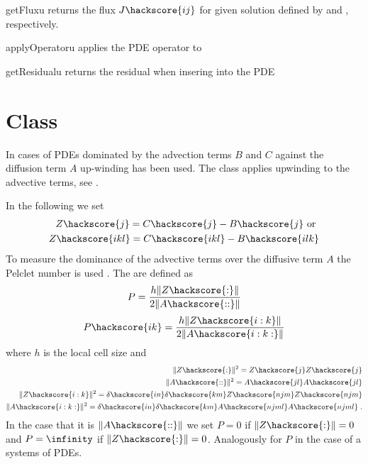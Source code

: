\begin{methoddesc}[LinearPDE]{getFlux}{u}
returns the flux $J\hackscore{ij}$  for given solution 
defined by  and , respectively.
\end{methoddesc}

\begin{methoddesc}[LinearPDE]{applyOperator}{u}
applies the PDE operator to 
\end{methoddesc}

\begin{methoddesc}[LinearPDE]{getResidual}{u}
returns the residual when insering  into the PDE
\end{methoddesc}

\section{\AdvectivePDE Class}
In cases of PDEs dominated by the advection terms $B$ and $C$ against the diffusion term $A$
up-winding has been used. 
The \AdvectivePDE class applies upwinding to the advective terms, see . 

In the following we set
\begin{eqnarray}\label{LINEARPDE.UPWIND.Z}
Z\hackscore{j}=C\hackscore{j}-B\hackscore{j}
\mbox{ or } \\
Z\hackscore{ikl}=C\hackscore{ikl}-B\hackscore{ilk}
\end{eqnarray}
To measure the dominance of the advective terms over the diffusive term $A$ the 
Pelclet number is used . The are defined as
\begin{eqnarray}\label{LINEARPDE.Peclet.single}
P=\frac{h\|Z\hackscore{:}\|}{2\|A\hackscore{::}\|}
\end{eqnarray}
\begin{eqnarray}\label{LINEARPDE.Peclet.system}
P\hackscore{ik}=\frac{h\|Z\hackscore{i:k}\|}{2\|A\hackscore{i:k:}\|}
\end{eqnarray}
where $h$ is the local cell size and
\begin{eqnarray}\label{LINEARPDE.ADVECTIVE.1b}
\|Z\hackscore{:}\|^2=Z\hackscore{j}Z\hackscore{j} \\
\|A\hackscore{::}\|^2=A\hackscore{jl}A\hackscore{jl} \\
\|Z\hackscore{i:k}\|^2=\delta\hackscore{in} \delta\hackscore{km} Z\hackscore{njm}Z\hackscore{njm} \\
\|A\hackscore{i:k:}\|^2=\delta\hackscore{in} \delta\hackscore{km} A\hackscore{njml}A\hackscore{njml} \; .
\end{eqnarray}
In the case that it is $\|A\hackscore{::}\|$ we set $P=0$ if $\|Z\hackscore{:}\|=0$ and
$P=\infinity$ if $\|Z\hackscore{:}\|=0$. Analogously for $P$ in the case of a systems of PDEs.

